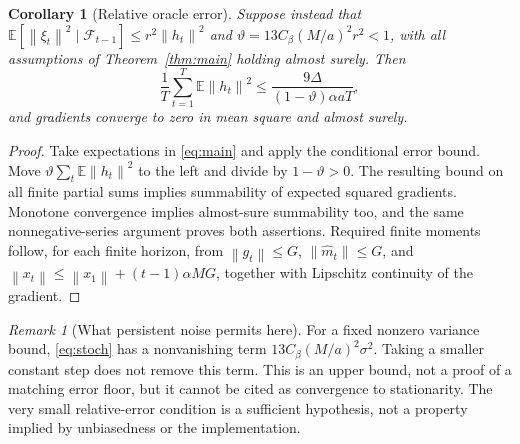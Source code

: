 \documentclass[11pt]{article}
\newtheorem{corollary}[theorem]{Corollary}
\theoremstyle{definition}
\theoremstyle{remark}
\newtheorem{remark}[theorem]{Remark}
\newcommand{\E}{\mathbb E}
\newcommand{\norm}[1]{\left\lVert#1\right\rVert}
\begin{document}
\begin{corollary}[Relative oracle error]\label{cor:relative}
Suppose instead that
$\E[\norm{\xi_t}^2\mid\mathcal F_{t-1}]\le r^2\norm{h_t}^2$ and
$\vartheta=13C_\beta(M/a)^2r^2<1$, with all assumptions of
Theorem~\ref{thm:main} holding almost surely. Then
\[
 \frac1T\sum_{t=1}^T\E\norm{h_t}^2
 \le\frac{9\Delta}{(1-\vartheta)\alpha aT},
\]
and gradients converge to zero in mean square and almost surely.
\end{corollary}
\begin{proof}
Take expectations in \eqref{eq:main} and apply the conditional error bound.
Move $\vartheta\sum_t\E\norm{h_t}^2$ to the left and divide by
$1-\vartheta>0$. The resulting bound on all finite partial sums implies
summability of expected squared gradients. Monotone convergence implies
almost-sure summability too, and the same nonnegative-series argument proves
both assertions. Required finite moments follow, for each finite horizon,
from $\norm{g_t}\le G$, $\norm{\widehat m_t}\le G$, and
$\norm{x_t}\le\norm{x_1}+(t-1)\alpha MG$, together with Lipschitz continuity
of the gradient.
\end{proof}

\begin{remark}[What persistent noise permits here]
For a fixed nonzero variance bound, \eqref{eq:stoch} has a nonvanishing
term $13C_\beta(M/a)^2\sigma^2$. Taking a smaller constant step does not
remove this term. This is an upper bound, not a proof of a matching error
floor, but it cannot be cited as convergence to stationarity. The very small
relative-error condition is a sufficient hypothesis, not a property implied
by unbiasedness or the implementation.
\end{remark}
\end{document}
